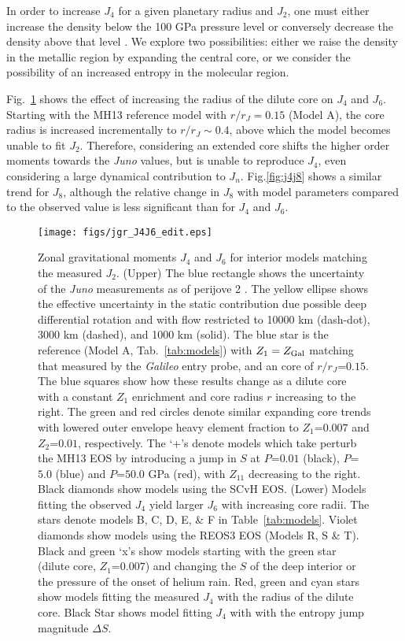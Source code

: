 In order to increase $J_4$ for a given planetary radius and $J_2$,  
one must either increase the density below the 100 GPa pressure level or
conversely decrease the density above that level \citep[][their
Fig.~5]{Guillot1999a}. We explore two possibilities: either we raise the density
in the metallic region by expanding the central core, or we consider the
possibility of an increased entropy in the molecular region.

Fig.~\ref{fig:j4j6} shows the effect of increasing the radius of the dilute
core on $J_4$ and $J_6$. Starting with the MH13 reference model with
$r/r_J=0.15$ (Model A), the core radius is increased incrementally to
$r/r_J\sim0.4$, above which the model becomes unable to fit $J_2$.  Therefore,
considering an extended core shifts the higher order moments towards the
\textit{Juno} values, but is unable to reproduce $J_4$, even considering a
large dynamical contribution to $J_n$.  Fig.\ref{fig:j4j8} shows a similar
trend for $J_8$, although the relative change in $J_8$ with model parameters
compared to the observed value is less significant than for $J_4$ and $J_6$. 


\begin{figure}[!h]
\centering

\texttt{[image: figs/jgr\_J4J6\_edit.eps]}

\caption{Zonal gravitational moments $J_4$ and $J_6$ for interior models
    matching the measured $J_2$.
    (Upper) The blue rectangle shows the uncertainty of the \textit{Juno}
    measurements as of perijove 2 \citep{Folkner2017}. The yellow ellipse shows
    the effective uncertainty in the static contribution due possible deep
    differential rotation \citep{Kaspi2017} and with flow restricted to 10000
    km (dash-dot), 3000 km (dashed), and 1000 km (solid). The blue star is the
    reference (Model A, Tab.~\ref{tab:models}) with $Z_1=Z_{\rm Gal}$ 
    matching that measured by the \textit{Galileo} entry probe, and an core of
    $r/r_J$=$0.15$. The blue squares show how these results change as a dilute
    core with a constant $Z_1$ enrichment and core radius $r$ increasing
    to the right. The green and red circles denote similar expanding core
    trends with lowered outer envelope heavy element fraction to 
    $Z_1$=$0.007$ and $Z_2$=$0.01$, respectively.  The `+'s denote models
    which take perturb the MH13 EOS by introducing a jump in $S$ at $P$=$0.01$
    (black), $P$=$5.0$ (blue) and $P$=$50.0$ GPa (red), with $Z_11$
    decreasing to the right. Black diamonds show models using the SCvH EOS.     
    (Lower) Models fitting the observed $J_4$ yield larger $J_6$ with increasing core
    radii. The stars denote models B, C, D, E, \& F in Table~\ref{tab:models}.
    Violet diamonds show models using the REOS3 EOS (Models R, S \& T).  Black
    and green `x's show models starting with the green star (dilute core,
    $Z_1$=$0.007$) and changing the $S$ of the deep interior or  the
    pressure of the onset of helium rain. Red, green and cyan stars show
    models fitting the measured $J_4$ with the radius of the dilute core.
    Black Star shows model fitting $J_4$ with with the entropy jump magnitude
    $\Delta S$. 
}
\label{fig:j4j6}
\end{figure}

